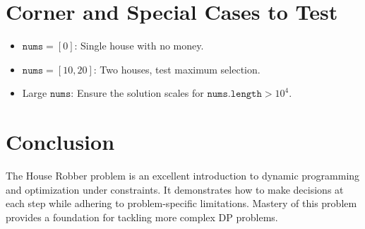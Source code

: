 \section*{Corner and Special Cases to Test}
\begin{itemize}
    \item \( \texttt{nums} = [0] \): Single house with no money.
    \item \( \texttt{nums} = [10, 20] \): Two houses, test maximum selection.
    \item Large \( \texttt{nums} \): Ensure the solution scales for \( \texttt{nums.length} > 10^4 \).
\end{itemize}

\section*{Conclusion}
The House Robber problem is an excellent introduction to dynamic programming and optimization under constraints. It demonstrates how to make decisions at each step while adhering to problem-specific limitations. Mastery of this problem provides a foundation for tackling more complex DP problems.